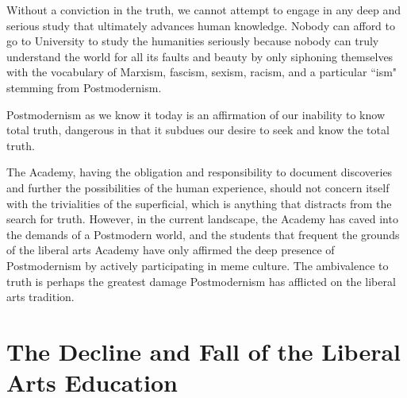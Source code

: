 \documentclass[12pt,letterpaper]{article}
\begin{document}
Without a conviction in the truth, we cannot attempt to engage in any deep and serious study that ultimately advances human knowledge.  Nobody can afford to go to University to study the humanities seriously because nobody can truly understand the world for all its faults and beauty by only siphoning themselves with the vocabulary of Marxism, fascism, sexism, racism, and a particular ``ism" stemming from Postmodernism.

Postmodernism as we know it today is an affirmation of our inability to know total truth, dangerous in that it subdues our desire to seek and know the total truth.  


The Academy, having the obligation and responsibility to document discoveries and further the possibilities of the human experience, should not concern itself with the trivialities of the superficial, which is anything that distracts from the search for truth.  However, in the current landscape, the Academy has caved into the demands of a Postmodern world, and the students that frequent the grounds of the liberal arts Academy have only affirmed the deep presence of Postmodernism by actively participating in meme culture.  The ambivalence to truth is perhaps the greatest damage Postmodernism has afflicted on the liberal arts tradition.

%
%
%



\section{The Decline and Fall of the Liberal Arts Education} 
\end{document}
